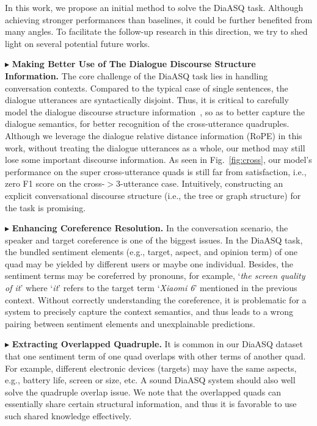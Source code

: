 \documentclass[11pt]{article}
\begin{document}
\vspace{-1mm}
In this work, we propose an initial method to solve the DiaASQ task.
Although achieving stronger performances than baselines, it could be further benefited from many angles.
To facilitate the follow-up research in this direction, we try to shed light on several potential future works.

\vspace{4pt}
\noindent$\blacktriangleright$ \textbf{Making Better Use of The Dialogue Discourse Structure Information.}
The core challenge of the DiaASQ task lies in handling conversation contexts.
Compared to the typical case of single sentences, the dialogue utterances are syntactically disjoint.
Thus, it is critical to carefully model the dialogue discourse structure information~\cite{FeiDiaREIJCAI22}, so as to better capture the dialogue semantics, for better recognition of the cross-utterance quadruples.
Although we leverage the dialogue relative distance information (RoPE) in this work, without treating the dialogue utterances as a whole, our method may still lose some important discourse information.
As seen in Fig.~\ref{fig:cross}, our model's performance on the super cross-utterance quads is still far from satisfaction, i.e., zero F1 score on the cross-$>$3-utterance case. 
Intuitively, constructing an explicit conversational discourse structure (i.e., the tree or graph structure) for the task is promising.

\vspace{4pt}
\noindent$\blacktriangleright$ \textbf{Enhancing Coreference Resolution.}
In the conversation scenario, the speaker and target coreference is one of the biggest issues.
In the DiaASQ task, the bundled sentiment elements (e.g., target, aspect, and opinion term) of one quad may be yielded by different users or maybe one individual.
Besides, the sentiment terms may be coreferred by pronouns, for example, `\emph{the screen quality of it}' where `\emph{it}' refers to the target term `\emph{Xiaomi 6}' mentioned in the previous context.
Without correctly understanding the coreference, it is problematic for a system to precisely capture the context semantics, and thus leads to a wrong pairing between sentiment elements and unexplainable predictions.

\vspace{4pt}
\noindent$\blacktriangleright$ \textbf{Extracting Overlapped Quadruple.}
It is common in our DiaASQ dataset that one sentiment term of one quad overlaps with other terms of another quad.
For example, different electronic devices (targets) may have the same aspects, e.g., battery life, screen or size, etc.
A sound DiaASQ system should also well solve the quadruple overlap issue.
We note that the overlapped quads can essentially share certain structural information, and thus it is favorable to use such shared knowledge effectively.
\end{document}
